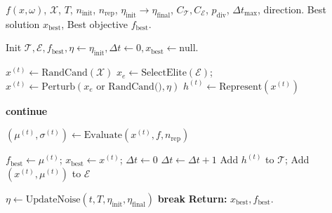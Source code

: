 \documentclass{article}
\begin{document}
\begin{algorithm}[h] 
\caption{TESO Algorithm}
\label{alg:TESO}
\footnotesize
\begin{algorithmic}[1]
\Require $f(x,\omega)$, $\mathcal{X}$, $T$, $n_{\text{init}}$, $n_{\text{rep}}$, $\eta_{\text{init}} \rightarrow \eta_{\text{final}}$, $C_{\mathcal{T}}, C_{\mathcal{E}}$, $p_{\text{div}}$, $\Delta t_{\text{max}}$, direction.
\Ensure Best solution $x_{\text{best}}$, Best objective $f_{\text{best}}$.

\State Init $\mathcal{T}, \mathcal{E}, f_{\text{best}}, \eta \gets \eta_{\text{init}}, \Delta t \gets 0, x_{\text{best}} \gets \text{null}$. 

    \State {}
        \State $x^{(t)} \gets \text{RandCand}(\mathcal{X})$ 
    \Else
        \State $x_e \gets \text{SelectElite}(\mathcal{E})$; $x^{(t)} \gets \text{Perturb}(x_e \text{ or RandCand()}, \eta)$ 
    \EndIf
    \State $h^{(t)} \gets \text{Represent}(x^{(t)})$

    \State {}
         \State \textbf{continue} 
    \EndIf

    \State {}
    \State $(\mu^{(t)}, \sigma^{(t)}) \gets \text{Evaluate}(x^{(t)}, f, n_{\text{rep}})$ 

    \State {}
        \State $f_{\text{best}} \gets \mu^{(t)}$; $x_{\text{best}} \gets x^{(t)}$; $\Delta t \gets 0$
     $\Delta t \gets \Delta t + 1$
    \EndIf
    \State Add $h^{(t)}$ to $\mathcal{T}$; Add $(x^{(t)}, \mu^{(t)})$ to $\mathcal{E}$ 

    \State {}
    \State $\eta \gets \text{UpdateNoise}(t, T, \eta_{\text{init}}, \eta_{\text{final}})$
     \textbf{break}  \EndIf
\EndFor
\State \textbf{Return:} $x_{\text{best}}, f_{\text{best}}$.
\end{algorithmic}
\end{algorithm}
\end{document}
